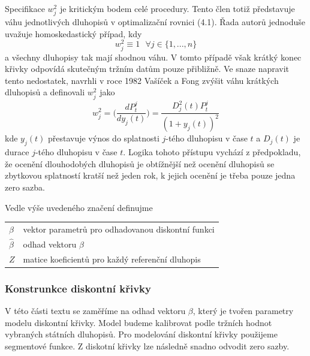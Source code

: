 \documentclass[a4paper]{book}
\begin{document}
Specifikace $w_j^2$ je kritickým bodem celé procedury. Tento člen totiž představuje váhu jednotlivých dluhopisů v optimalizační rovnici (4.1). Řada autorů jednoduše uvažuje homoskedastický případ, kdy
\begin{equation*}
w_j^2 \equiv 1 ~~~ \forall j \in \{1, ..., n\} 
\end{equation*}
a všechny dluhopisy tak mají shodnou váhu. V tomto případě však krátký konec křivky odpovídá skutečným tržním datům pouze přibližně. Ve snaze napravit tento nedostatek, navrhli v roce 1982 Vašíček a Fong zvýšit váhu krátkých dluhopisů a definovali $w_j^2$ jako
\begin{equation*}
w_j^2 = \Bigg( \frac{d P_t^j}{dy_j(t)} \Bigg) = \frac{D_j^2(t)P_t^j}{(1 + y_j(t))^2}
\end{equation*}
kde $y_j(t)$ přestavuje výnos do splatnosti $j$-tého dluhopisu v čase $t$ a $D_j(t)$ je durace $j$-tého dluhopisu v čase $t$. Logika tohoto přístupu vychází z předpokladu, že ocenění dlouhodobých dluhopisů je obtížnější než ocenění dluhopisů se zbytkovou splatností kratší než jeden rok, k jejich ocenění je třeba pouze jedna zero sazba.

Vedle výše uvedeného značení definujme
\begin{center}
\begin{tabular}{l l}
$\beta$ & vektor parametrů pro odhadovanou diskontní funkci\\
$\hat{\beta}$ & odhad vektoru $\beta$\\
$Z$ & matice koeficientů pro každý referenční dluhopis\\
\end{tabular}
\end{center}

\subsubsection{Konstrunkce diskontní křivky}

V této části textu se zaměříme na odhad vektoru $\beta$, který je tvořen parametry modelu diskontní křivky. Model budeme kalibrovat podle tržních hodnot vybraných státních dluhopisů. Pro modelování diskontní křivky použijeme segmentové funkce. Z diskotní křivky lze následně snadno odvodit zero sazby.\\
\end{document}
